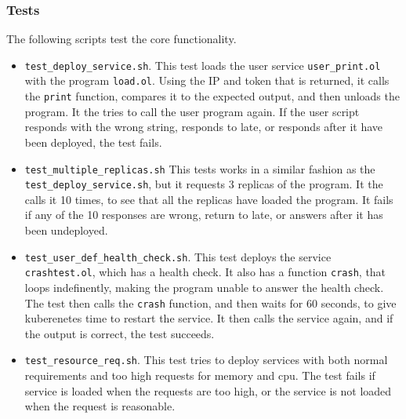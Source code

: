 \documentclass[Report.tex]{subfiles}
\begin{document}
\subsubsection{Tests}
The following scripts test the core functionality.
\begin{itemize}
\item {\tt test\_deploy\_service.sh}. This test loads the user service {\tt user\_print.ol} with the program {\tt load.ol}. Using the IP and token that is returned, it calls the {\tt print} function, compares it to the expected output, and then unloads the program. It the tries to call the user program again. If the user script responds with the wrong string, responds to late, or responds after it have been deployed, the test fails.
\item {\tt test\_multiple\_replicas.sh} This tests works in a similar fashion as the {\tt test\_deploy\_service.sh}, but it requests 3 replicas of the program. It the calls it 10 times, to see that all the replicas have loaded the program. It fails if any of the 10 responses are wrong, return to late, or answers after it has been undeployed.
\item {\tt test\_user\_def\_health\_check.sh}. This test deploys the service {\tt crashtest.ol}, which has a health check. It also has a function {\tt crash}, that loops indefinently, making the program unable to answer the health check. The test then calls the {\tt crash} function, and then waits for 60 seconds, to give kuberenetes time to restart the service. It then calls the service again, and if the output is correct, the test succeeds.
\item {\tt test\_resource\_req.sh}. This test tries to deploy services with both normal requirements and too high requests for memory and cpu. The test fails if service is loaded when the requests are too high, or the service is not loaded when the request is reasonable.
\end{itemize}
\end{document}

